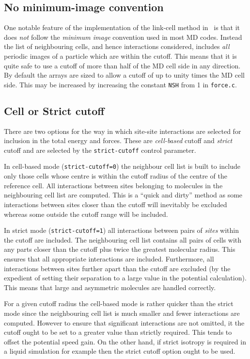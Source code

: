 \subsection*{No minimum-image convention}
One notable feature of the implementation of the link-cell method in
\moldy\ is that it does {\em not} follow the {\em minimum image}
convention used in most MD codes.  Instead the list of neighbouring
cells, and hence interactions considered, includes {\em all} periodic
images of a particle which are within the cutoff.  This means that it
is quite safe to use a cutoff of more than half of the MD cell side in
any direction.  By default the arrays are sized to allow a cutoff of
up to unity times the MD cell side.  This may be increased by
increasing the constant \verb'NSH' from 1 in \verb`force.c`.


\subsection*{Cell or Strict cutoff}
There are two options for the way in which site-site interactions are
selected for inclusion in the total energy and forces.  These are
{\em cell-based} cutoff and {\em strict} cutoff and are selected
by the \verb'strict-cutoff' control parameter.

In cell-based mode (\verb'strict-cutoff=0') the neighbour cell list is
built to include only those cells whose centre is within the cutoff
radius of the centre of the reference cell.  All interactions between
sites belonging to molecules in the neighbouring cell list are
computed.  This is a ``quick and dirty'' method as some interactions
between sites closer than the cutoff will inevitably be excluded
whereas some outside the cutoff range will be included.

In strict mode (\verb'strict-cutoff=1') all interactions between pairs
of {\em sites} within the cutoff are included.  The neighbouring cell
list contains all pairs of cells with any parts closer than the cutoff
plus twice the greatest molecular radius.  This ensures that all
appropriate interactions are included.  Furthermore, all interactions
between sites further apart than the cutoff are excluded (by the
expedient of setting their separation to a large value in the
potential calculation).  This means that large and asymmetric
molecules are handled correctly.  

For a given cutoff radius the cell-based mode is rather quicker than
the strict mode since the neighbouring cell list is much smaller and
fewer interactions are computed.  However to ensure that significant
interactions are not omitted, it the cutoff ought to be set to a
greater value than strictly required.    This tends to offset the
potential speed gain.   On the other hand, if strict isotropy is
required in a liquid simulation for example then the strict cutoff
option ought to be used.


